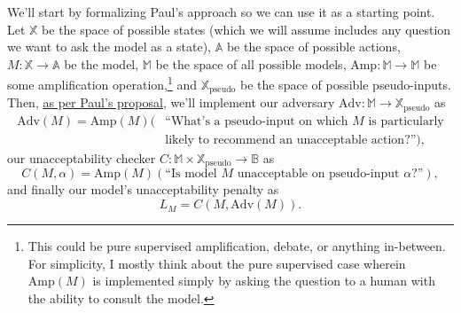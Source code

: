 \documentclass{amsart}
\begin{document}
We'll start by formalizing Paul's approach so we can use it as a starting point. Let $\mathbb X$ be the space of possible states (which we will assume includes any question we want to ask the model as a state), $\mathbb A$ be the space of possible actions, $M: \mathbb X \to \mathbb A$ be the model, $\mathbb M$ be the space of all possible models, $\text{Amp}: \mathbb M \to \mathbb M$ be some amplification operation,\footnote{This could be pure supervised amplification, debate, or anything in-between. For simplicity, I mostly think about the pure supervised case wherein $\text{Amp}(M)$ is implemented simply by asking the question to a human with the ability to consult the model.} and $\mathbb X_\text{pseudo}$ be the space of possible pseudo-inputs. Then, \href{https://ai-alignment.com/training-robust-corrigibility-ce0e0a3b9b4d}{as per Paul's proposal}, we'll implement
our adversary $\text{Adv}: \mathbb M \to \mathbb X_\text{pseudo}$ as
\begin{align*}
    \text{Adv}(M) = \text{Amp}(M)(&\text{``What's a pseudo-input on which } M \text{ is particularly} \\
    & \text{likely to recommend an unacceptable action?''}),
\end{align*}
our unacceptability checker $C: \mathbb M \times \mathbb X_\text{pseudo} \to \mathbb B$ as
\[
    C(M, \alpha) = \text{Amp}(M)(\text{``Is model } M \text{ unacceptable on pseudo-input } \alpha \text{?''}),
\]
and finally our model's unacceptability penalty as
\[
    L_M = C(M, \text{Adv}(M)).
\]
\end{document}
